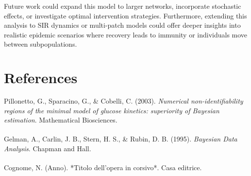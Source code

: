 \documentclass[a4paper,10pt]{report}
\begin{document}
Future work could expand this model to larger networks, incorporate stochastic effects, or investigate optimal intervention strategies. Furthermore, extending this analysis to SIR dynamics or multi-patch models could offer deeper insights into realistic epidemic scenarios where recovery leads to immunity or individuals move between subpopulations.


\section*{References}


Pillonetto, G., Sparacino, G., \& Cobelli, C. (2003).
\textit{Numerical non-identifiability regions of the minimal model of glucose kinetics: superiority of Bayesian estimation}.
Mathematical Biosciences.\\ \\
Gelman, A., Carlin, J. B., Stern, H. S., \& Rubin, D. B. (1995).
\textit{Bayesian Data Analysis}.
Chapman and Hall.\\ \\
Cognome, N. (Anno). *Titolo dell'opera in corsivo*. Casa editrice.
\end{document}
